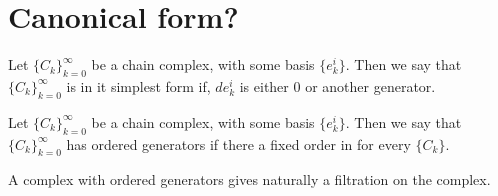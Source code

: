 \chapter{Canonical form?}


\begin{definition}

Let $\{C_k\}_{k=0}^{\infty}$ be a chain complex, with some basis $\{e_k^i\}$.
Then we say that $\{C_k\}_{k=0}^{\infty}$ is in it simplest form if, $de_k^i$
is either $0$ or another generator.
\end{definition}

\begin{definition}

Let $\{C_k\}_{k=0}^{\infty}$ be a chain complex, with some basis $\{e_k^i\}$.
Then we say that $\{C_k\}_{k=0}^{\infty}$ has ordered generators if there a fixed order in for every 
$\{C_k\}$.
\end{definition}

\begin{remark}
A complex with ordered generators gives naturally a filtration on the complex.
\end{remark}
